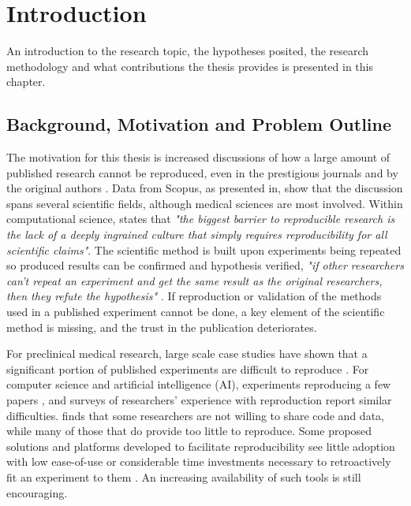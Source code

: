 
\chapter{Introduction}

An introduction to the research topic, the hypotheses posited, the research methodology and what contributions the thesis provides is presented in this chapter.

\section{Background, Motivation and Problem Outline}
The motivation for this thesis is increased discussions of how a large amount of published research cannot be reproduced, even in the prestigious journals and by the original authors \citep{aarts2016, begley2012drug, begley2015reproducibility, prinz2011believe}. Data from Scopus, as presented in\cite{Goodman341ps12}, show that the discussion spans several scientific fields, although medical sciences are most involved. Within computational science, \cite{peng2011reproducible} states that \emph{"the biggest barrier to reproducible research is the lack of a deeply ingrained culture that simply requires reproducibility for all scientific claims"}. The scientific method is built upon experiments being repeated so produced results can be confirmed and hypothesis verified, \emph{"if other researchers can't repeat an experiment and get the same result as the original researchers, then they refute the hypothesis"} \citep[p.~285]{oates2006}. If reproduction or validation of the methods used in a published experiment cannot be done, a key element of the scientific method is missing, and the trust in the publication deteriorates.

For preclinical medical research, large scale case studies have shown that a significant portion of published experiments are difficult to reproduce \citep{begley2012drug, begley2015reproducibility, prinz2011believe}. For computer science and artificial intelligence (AI), experiments reproducing a few papers \citep{hunold2013state, fokkens2013offspring}, and surveys of researchers' experience with reproduction \citep{hunold2015survey} report similar difficulties. \cite{Collberg2016} finds that some researchers are not willing to share code and data, while many of those that do provide too little to reproduce. Some proposed solutions and platforms developed to facilitate reproducibility see little adoption with low ease-of-use or considerable time investments necessary to retroactively fit an experiment to them \citep{gent2014recomputation}. An increasing availability of such tools is still encouraging.

